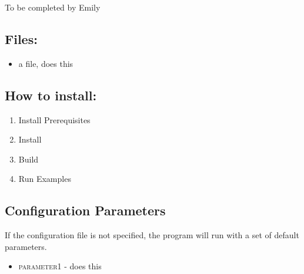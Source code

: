 To be completed by Emily

\subsection{Files:}

\begin{itemize}
\item{a file, does this}
\end{itemize}


\subsection{How to install:}
\begin{enumerate}
	\item{Install Prerequisites} 
	\item{Install } 
	\item{Build } 
	\item{Run Examples} 
\end{enumerate}

\subsection{Configuration Parameters}
If the configuration file is not specified, the program will run with a set of default parameters.
\begin{itemize}
	\item{\textsc{parameter1 }} - does this

\end{itemize}



